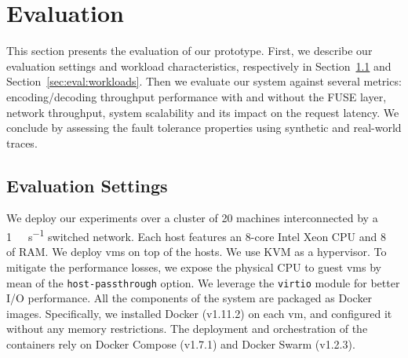 \section{Evaluation}
\label{sec:evaluation}

This section presents the evaluation of our \SYS prototype. 
First, we describe our evaluation settings and workload characteristics, respectively in Section~\ref{sec:eval:settings} and Section~\ref{sec:eval:workloads}.
Then we evaluate our system against several metrics: encoding/decoding throughput performance with and without the FUSE layer, network throughput, system scalability and its impact on the request latency.
We conclude by assessing the fault tolerance properties using synthetic and real-world traces.

\subsection{Evaluation Settings}
\label{sec:eval:settings}

We deploy our experiments over a cluster of \num{20} machines interconnected by a \SI{1}{\giga\bit\per\second} switched network.
Each host features an 8-core Intel Xeon CPU and \SI{8}{\giga\byte} of RAM.
We deploy \acp{vm} on top of the hosts.
We use KVM as a hypervisor.
To mitigate the performance losses, we expose the physical CPU to guest \acp{vm} by mean of the \texttt{host-passthrough} option.
We leverage the \texttt{virtio} module for better I/O performance.
All the components of the system are packaged as Docker images.
Specifically, we installed Docker (v1.11.2) on each \ac{vm}, and configured it without any memory restrictions.
The deployment and orchestration of the containers rely on Docker Compose (v1.7.1) and Docker Swarm (v1.2.3).

